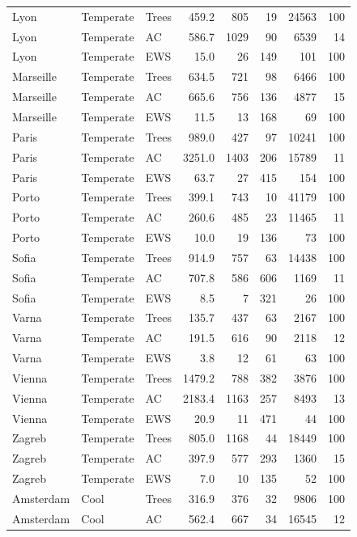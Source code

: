 \begin{longtable}{lllrrrrr}
  Lyon & Temperate & Trees & 459.2 & 805 & 19 & 24563 & 100 \\ 
  Lyon & Temperate & AC & 586.7 & 1029 & 90 & 6539 & 14 \\ 
  Lyon & Temperate & EWS & 15.0 & 26 & 149 & 101 & 100 \\ 
  Marseille & Temperate & Trees & 634.5 & 721 & 98 & 6466 & 100 \\ 
  Marseille & Temperate & AC & 665.6 & 756 & 136 & 4877 & 15 \\ 
  Marseille & Temperate & EWS & 11.5 & 13 & 168 & 69 & 100 \\ 
  Paris & Temperate & Trees & 989.0 & 427 & 97 & 10241 & 100 \\ 
  Paris & Temperate & AC & 3251.0 & 1403 & 206 & 15789 & 11 \\ 
  Paris & Temperate & EWS & 63.7 & 27 & 415 & 154 & 100 \\ 
  Porto & Temperate & Trees & 399.1 & 743 & 10 & 41179 & 100 \\ 
  Porto & Temperate & AC & 260.6 & 485 & 23 & 11465 & 11 \\ 
  Porto & Temperate & EWS & 10.0 & 19 & 136 & 73 & 100 \\ 
  Sofia & Temperate & Trees & 914.9 & 757 & 63 & 14438 & 100 \\ 
  Sofia & Temperate & AC & 707.8 & 586 & 606 & 1169 & 11 \\ 
  Sofia & Temperate & EWS & 8.5 & 7 & 321 & 26 & 100 \\ 
  Varna & Temperate & Trees & 135.7 & 437 & 63 & 2167 & 100 \\ 
  Varna & Temperate & AC & 191.5 & 616 & 90 & 2118 & 12 \\ 
  Varna & Temperate & EWS & 3.8 & 12 & 61 & 63 & 100 \\ 
  Vienna & Temperate & Trees & 1479.2 & 788 & 382 & 3876 & 100 \\ 
  Vienna & Temperate & AC & 2183.4 & 1163 & 257 & 8493 & 13 \\ 
  Vienna & Temperate & EWS & 20.9 & 11 & 471 & 44 & 100 \\ 
  Zagreb & Temperate & Trees & 805.0 & 1168 & 44 & 18449 & 100 \\ 
  Zagreb & Temperate & AC & 397.9 & 577 & 293 & 1360 & 15 \\ 
  Zagreb & Temperate & EWS & 7.0 & 10 & 135 & 52 & 100 \\ 
  Amsterdam & Cool & Trees & 316.9 & 376 & 32 & 9806 & 100 \\ 
  Amsterdam & Cool & AC & 562.4 & 667 & 34 & 16545 & 12 \\ 

\end{longtable}
